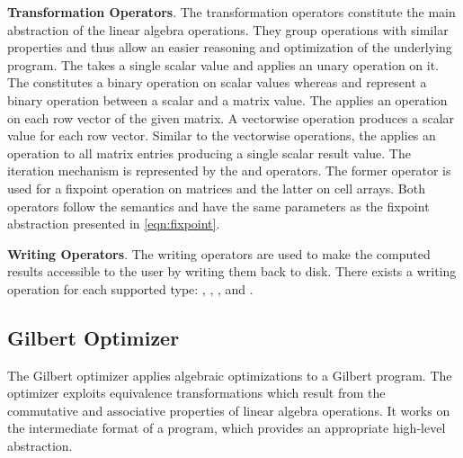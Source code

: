 \textbf{Transformation Operators}. The transformation operators constitute the main abstraction of the linear algebra operations.
They group operations with similar properties and thus allow an easier reasoning and optimization of the underlying program. The  takes a single scalar value and applies an unary operation on it. The  constitutes a binary operation on scalar values whereas  and  represent a binary operation between a scalar and a matrix value. The  applies an operation on each row vector of the given matrix.
A vectorwise operation produces a scalar value for each row vector. Similar to the vectorwise operations, the  applies an operation to all matrix entries producing a single scalar result value. The iteration mechanism is represented by the  and  operators. The former operator is used for a fixpoint operation on matrices and the latter on cell arrays. Both operators follow the semantics and have the same parameters as the fixpoint abstraction presented in \cref{eqn:fixpoint}.


\textbf{Writing Operators}. The writing operators are used to make the computed results accessible to the user by writing them back to disk.
There exists a writing operation for each supported type: , , ,  and .

\subsection{Gilbert Optimizer}
\label{sec:gilbertOptimizer}

The Gilbert optimizer applies algebraic optimizations to a Gilbert program.
The optimizer exploits equivalence transformations which result from the commutative and associative properties of linear algebra operations.
It works on the intermediate format of a program, which provides an appropriate high-level abstraction.



